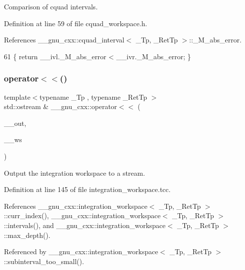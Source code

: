 Comparison of cquad intervals. 

Definition at line 59 of file cquad\+\_\+workspace.\+h.



References \+\_\+\+\_\+gnu\+\_\+cxx\+::cquad\+\_\+interval$<$ \+\_\+\+Tp, \+\_\+\+Ret\+Tp $>$\+::\+\_\+\+M\+\_\+abs\+\_\+error.


\begin{DoxyCode}
61     \{ \textcolor{keywordflow}{return} \_\_ivl.\_M\_abs\_error < \_\_ivr.\_M\_abs\_error; \}
\end{DoxyCode}
\mbox{\label{namespace____gnu__cxx_a2f2af1d76b024a139e350aa0f81ac272}} 
\subsubsection{\texorpdfstring{operator$<$$<$()}{operator<<()}}
{\footnotesize\ttfamily template$<$typename \+\_\+\+Tp , typename \+\_\+\+Ret\+Tp $>$ \\
std\+::ostream \& \+\_\+\+\_\+gnu\+\_\+cxx\+::operator$<$$<$ (\begin{DoxyParamCaption}\item[{std\+::ostream \&}]{\+\_\+\+\_\+out,  }\item[{const \hyperlink{class____gnu__cxx_1_1integration__workspace}{integration\+\_\+workspace}$<$ \hyperlink{namespace____gnu__cxx_a3b19a9c800ca194374ef9172290f7d79}{\+\_\+\+Tp}, \hyperlink{namespace____gnu__cxx_a886e03ece3d53ff7fa6c098a40f93fa5}{\+\_\+\+Ret\+Tp} $>$ \&}]{\+\_\+\+\_\+ws }\end{DoxyParamCaption})}

Output the integration workspace to a stream. 

Definition at line 145 of file integration\+\_\+workspace.\+tcc.



References \+\_\+\+\_\+gnu\+\_\+cxx\+::integration\+\_\+workspace$<$ \+\_\+\+Tp, \+\_\+\+Ret\+Tp $>$\+::curr\+\_\+index(), \+\_\+\+\_\+gnu\+\_\+cxx\+::integration\+\_\+workspace$<$ \+\_\+\+Tp, \+\_\+\+Ret\+Tp $>$\+::intervals(), and \+\_\+\+\_\+gnu\+\_\+cxx\+::integration\+\_\+workspace$<$ \+\_\+\+Tp, \+\_\+\+Ret\+Tp $>$\+::max\+\_\+depth().



Referenced by \+\_\+\+\_\+gnu\+\_\+cxx\+::integration\+\_\+workspace$<$ \+\_\+\+Tp, \+\_\+\+Ret\+Tp $>$\+::subinterval\+\_\+too\+\_\+small().


